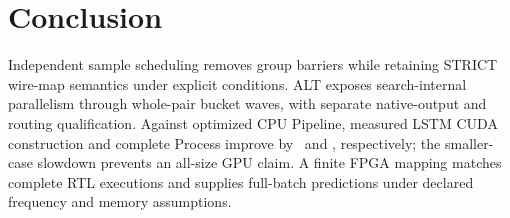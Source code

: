 \section{Conclusion}
Independent sample scheduling removes group barriers while retaining STRICT wire-map semantics under explicit conditions. ALT exposes search-internal parallelism through whole-pair bucket waves, with separate native-output and routing qualification. Against optimized CPU Pipeline, measured LSTM CUDA construction and complete Process improve by \LstmPipeBuild\ and \LstmPipeProc, respectively; the smaller-case slowdown prevents an all-size GPU claim. A finite FPGA mapping matches complete RTL executions and supplies full-batch predictions under declared frequency and memory assumptions. 

